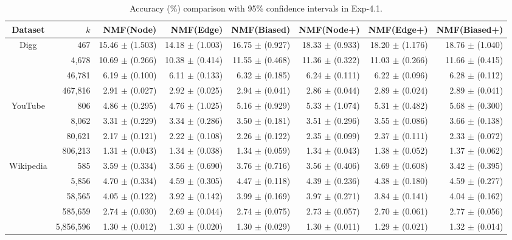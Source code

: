 \documentclass[10pt,journal,compsoc]{IEEEtran}
\newcommand{\Node}{{\sf NMF(Node)}\xspace}
\newcommand{\Edge}{{\sf NMF(Edge)}\xspace}
\newcommand{\Biased}{{\sf NMF(Biased)}\xspace}
\newcommand{\Digg}{{\sf Digg}\xspace}
\newcommand{\YouTube}{{\sf YouTube}\xspace}
\newcommand{\Wikipedia}{{\sf Wikipedia}\xspace}
\newcommand{\Nodep}{{\sf NMF(Node+)}\xspace}
\newcommand{\Edgep}{{\sf NMF(Edge+)}\xspace}
\newcommand{\Biasedp}{{\sf NMF(Biased+)}\xspace}
\begin{document}
\begin{table}
\caption{Accuracy (\%) comparison with 95\% confidence intervals in Exp-4.1.}
\label{tab_accuracy_5}
\vspace{-2ex}
\centering
\newcommand{\tabincell}[2]{\begin{tabular}{@{}#1@{}}#2\end{tabular}}
\begin{tabular}{c|r|r|r|r|r|r|r}
\hline \hline Dataset  & $k$ & \Node & \Edge & \Biased & \Nodep & \Edgep & \Biasedp  \\
\hline
\multirow{4}{*}{\Digg}
 & 467     & 15.46 $\pm$ (1.503) & 14.18 $\pm$ (1.003) & 16.75 $\pm$ (0.927) & 18.33 $\pm$ (0.933) & 18.20 $\pm$ (1.176) & 18.76 $\pm$ (1.040) \\
 & 4,678   & 10.69 $\pm$ (0.266) & 10.38 $\pm$ (0.414) & 11.55 $\pm$ (0.468) & 11.36 $\pm$ (0.322) & 11.03 $\pm$ (0.266) & 11.66 $\pm$ (0.415)  \\
 & 46,781  & 6.19 $\pm$ (0.100) & 6.11 $\pm$ (0.133) & 6.32 $\pm$ (0.185) & 6.24 $\pm$ (0.111) & 6.22 $\pm$ (0.096) & 6.28 $\pm$ (0.112)  \\
 & 467,816 & 2.91 $\pm$ (0.027) & 2.92 $\pm$ (0.025) & 2.94 $\pm$ (0.041) & 2.86 $\pm$ (0.044) & 2.89 $\pm$ (0.024) & 2.89 $\pm$ (0.041) \\
\hline
\multirow{4}{*}{\YouTube}
 & 806     & 4.86 $\pm$ (0.295) & 4.76 $\pm$ (1.025) & 5.16 $\pm$ (0.929) & 5.33 $\pm$ (1.074) & 5.31 $\pm$ (0.482) & 5.68 $\pm$ (0.300)  \\
 & 8,062   & 3.31 $\pm$ (0.229) & 3.34 $\pm$ (0.286) & 3.50 $\pm$ (0.181) & 3.51 $\pm$ (0.296) & 3.55 $\pm$ (0.086) & 3.66 $\pm$ (0.138)  \\
 & 80,621  & 2.17 $\pm$ (0.121) & 2.22 $\pm$ (0.108) & 2.26 $\pm$ (0.122) & 2.35 $\pm$ (0.099) & 2.37 $\pm$ (0.111) & 2.33 $\pm$ (0.072)  \\
 & 806,213 & 1.31 $\pm$ (0.043) & 1.34 $\pm$ (0.038) & 1.34 $\pm$ (0.059) & 1.34 $\pm$ (0.043) & 1.38 $\pm$ (0.052) & 1.37 $\pm$ (0.062) \\
\hline
\multirow{5}{*}{\Wikipedia}
 & 585       & 3.59 $\pm$ (0.334) & 3.56 $\pm$ (0.690) & 3.76 $\pm$ (0.716) & 3.56 $\pm$ (0.406) & 3.69 $\pm$ (0.608) & 3.42 $\pm$ (0.395)  \\
 & 5,856     & 4.70 $\pm$ (0.334) & 4.59 $\pm$ (0.305) & 4.47 $\pm$ (0.118) & 4.39 $\pm$ (0.236) & 4.38 $\pm$ (0.180) & 4.59 $\pm$ (0.277)  \\
 & 58,565    & 4.05 $\pm$ (0.122) & 3.92 $\pm$ (0.142) & 3.99 $\pm$ (0.169) & 3.97 $\pm$ (0.271) & 3.84 $\pm$ (0.141) & 4.04 $\pm$ (0.162)  \\
 & 585,659   & 2.74 $\pm$ (0.030) & 2.69 $\pm$ (0.044) & 2.74 $\pm$ (0.075) & 2.73 $\pm$ (0.057) & 2.70 $\pm$ (0.061) & 2.77 $\pm$ (0.056) \\
 & 5,856,596 & 1.30 $\pm$ (0.012) & 1.30 $\pm$ (0.020) & 1.30 $\pm$ (0.029) & 1.30 $\pm$ (0.011) & 1.29 $\pm$ (0.021) & 1.32 $\pm$ (0.014)  \\
\hline \hline
\end{tabular}
\vspace{-2ex}
\end{table}
\end{document}
